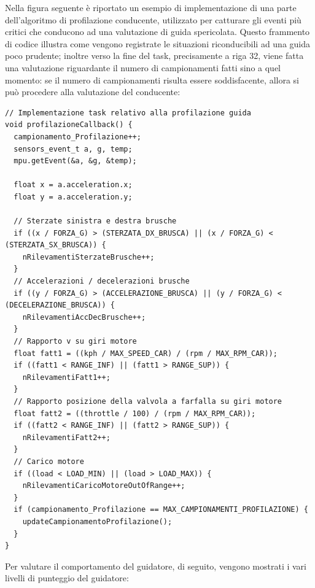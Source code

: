 \documentclass[12pt, a4paper, italian]{report}
\numberwithin{figure}{chapter}
\numberwithin{table}{chapter}
\begin{document}
\vspace{1cm}
Nella figura seguente è riportato un esempio di implementazione di una parte dell'algoritmo di profilazione conducente, utilizzato per catturare gli eventi più critici che conducono ad una valutazione di guida spericolata. Questo frammento di codice illustra come vengono registrate le situazioni riconducibili ad una guida poco prudente; inoltre verso la fine del task, precisamente a riga 32, viene fatta una valutazione riguardante il numero di campionamenti fatti sino a quel momento: se il numero di campionamenti risulta essere soddisfacente, allora si può procedere alla valutazione del conducente:

\vspace{0.5cm}

\begin{lstlisting}
// Implementazione task relativo alla profilazione guida
void profilazioneCallback() {
  campionamento_Profilazione++;
  sensors_event_t a, g, temp;
  mpu.getEvent(&a, &g, &temp);

  float x = a.acceleration.x;
  float y = a.acceleration.y;

  // Sterzate sinistra e destra brusche
  if ((x / FORZA_G) > (STERZATA_DX_BRUSCA) || (x / FORZA_G) < (STERZATA_SX_BRUSCA)) {
    nRilevamentiSterzateBrusche++;
  }
  // Accelerazioni / decelerazioni brusche
  if ((y / FORZA_G) > (ACCELERAZIONE_BRUSCA) || (y / FORZA_G) < (DECELERAZIONE_BRUSCA)) {
    nRilevamentiAccDecBrusche++;
  }
  // Rapporto v su giri motore
  float fatt1 = ((kph / MAX_SPEED_CAR) / (rpm / MAX_RPM_CAR));
  if ((fatt1 < RANGE_INF) || (fatt1 > RANGE_SUP)) {
    nRilevamentiFatt1++;
  }
  // Rapporto posizione della valvola a farfalla su giri motore
  float fatt2 = ((throttle / 100) / (rpm / MAX_RPM_CAR));
  if ((fatt2 < RANGE_INF) || (fatt2 > RANGE_SUP)) {
    nRilevamentiFatt2++;
  }
  // Carico motore
  if ((load < LOAD_MIN) || (load > LOAD_MAX)) {
    nRilevamentiCaricoMotoreOutOfRange++;
  }
  if (campionamento_Profilazione == MAX_CAMPIONAMENTI_PROFILAZIONE) {  
    updateCampionamentoProfilazione();
  }
}
\end{lstlisting}

\vspace{1cm}

Per valutare il comportamento del guidatore, di seguito, vengono mostrati i vari livelli di punteggio del guidatore:
\end{document}
